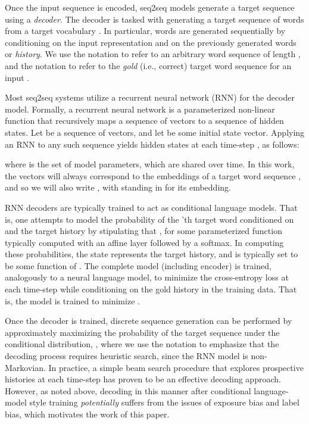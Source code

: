 \documentclass[11pt,letterpaper]{article}
\begin{document}
Once the input sequence is encoded, seq2seq models generate a target
sequence using a \textit{decoder}. The decoder is tasked with
generating a target sequence of words from a target vocabulary . In particular, words are generated sequentially by conditioning on the input representation  and on the previously generated words or \textit{history}. We use the notation  to refer to an arbitrary word sequence of length , and the notation  to refer to the \textit{gold} (i.e., correct) target word sequence for an input . 

Most seq2seq systems utilize a recurrent neural network (RNN) for the decoder model. Formally, a recurrent neural network is a parameterized non-linear
function  that recursively maps a sequence of vectors to a
sequence of hidden states. Let  be a
sequence of  vectors, and let  be some initial state
vector. Applying an RNN to any such sequence yields hidden states
 at each time-step , as follows:

where  is the set of model parameters, which are shared over time. In this work, the vectors  will always correspond to the embeddings of a target word sequence , and so we will also write , with  standing in for its embedding.
 










RNN decoders are typically trained to act as conditional language
models. That is, one attempts to model the probability of the 'th target
word conditioned on  and the target history by stipulating that , for some parameterized function  typically computed with an affine layer followed by a softmax. In computing these probabilities, the state  represents the target history, and  is typically set to be some function of . The complete model (including encoder) is trained,
analogously to a neural language model, to minimize the cross-entropy
loss at each time-step while conditioning on the gold history in the
training data. That is, the model is trained to minimize .

Once the decoder is trained, discrete sequence generation can be
performed by approximately maximizing the probability of the target
sequence under the conditional distribution,
, where we use the notation  to emphasize that the decoding process requires heuristic search, since the RNN model is non-Markovian. In practice, a simple beam search
procedure that explores  prospective histories at each time-step
has proven to be an effective decoding approach. However, as noted above,
decoding in this manner after conditional language-model style training \textit{potentially} suffers from the issues of exposure bias and label bias, which motivates the work of this paper.
\end{document}
